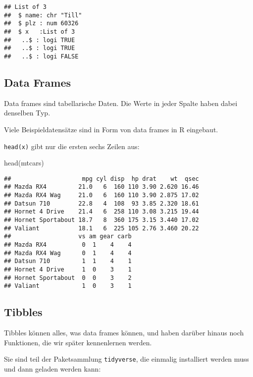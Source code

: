 \documentclass[11pt,german,a4paper]{article}
\newenvironment{Shaded}{\begin{snugshade}}{\end{snugshade}}
\newcommand{\FunctionTok}[1]{\textcolor[rgb]{0.00,0.00,0.00}{#1}}
\newcommand{\NormalTok}[1]{#1}
\begin{document}
\begin{verbatim}
## List of 3
##  $ name: chr "Till"
##  $ plz : num 60326
##  $ x   :List of 3
##   ..$ : logi TRUE
##   ..$ : logi TRUE
##   ..$ : logi FALSE
\end{verbatim}

\hypertarget{data-frames}{%
\subsection{Data Frames}\label{data-frames}}

Data frames sind tabellarische Daten. Die Werte in jeder Spalte haben dabei denselben Typ.

Viele Beispieldatensätze sind in Form von data frames in R eingebaut.

\texttt{head(x)} gibt nur die ersten sechs Zeilen aus:

\begin{Shaded}
\begin{Highlighting}[]
\FunctionTok{head}\NormalTok{(mtcars)}
\end{Highlighting}
\end{Shaded}

\begin{verbatim}
##                    mpg cyl disp  hp drat    wt  qsec
## Mazda RX4         21.0   6  160 110 3.90 2.620 16.46
## Mazda RX4 Wag     21.0   6  160 110 3.90 2.875 17.02
## Datsun 710        22.8   4  108  93 3.85 2.320 18.61
## Hornet 4 Drive    21.4   6  258 110 3.08 3.215 19.44
## Hornet Sportabout 18.7   8  360 175 3.15 3.440 17.02
## Valiant           18.1   6  225 105 2.76 3.460 20.22
##                   vs am gear carb
## Mazda RX4          0  1    4    4
## Mazda RX4 Wag      0  1    4    4
## Datsun 710         1  1    4    1
## Hornet 4 Drive     1  0    3    1
## Hornet Sportabout  0  0    3    2
## Valiant            1  0    3    1
\end{verbatim}

\hypertarget{tibbles}{%
\subsection{Tibbles}\label{tibbles}}

Tibbles können alles, was data frames können, und haben darüber hinaus noch Funktionen, die wir später kennenlernen werden.

Sie sind teil der Paketsammlung \texttt{tidyverse}, die einmalig installiert werden muss und dann geladen werden kann:
\end{document}
